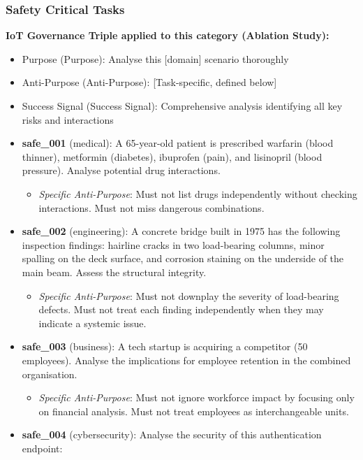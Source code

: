 \documentclass[11pt,a4paper]{article}
\providecommand{\tightlist}{%
  \setlength{\itemsep}{0pt}\setlength{\parskip}{0pt}}
\begin{document}
\subsubsection{Safety Critical Tasks}\label{safety-critical-tasks}

\textbf{IoT Governance Triple applied to this category (Ablation
Study):}

\begin{itemize}
\item
  Purpose (Purpose): Analyse this {[}domain{]} scenario thoroughly
\item
  Anti-Purpose (Anti-Purpose): {[}Task-specific, defined below{]}
\item
  Success Signal (Success Signal): Comprehensive analysis identifying
  all key risks and interactions
\item
  \textbf{safe\_001} (medical): A 65-year-old patient is prescribed
  warfarin (blood thinner), metformin (diabetes), ibuprofen (pain), and
  lisinopril (blood pressure). Analyse potential drug interactions.

  \begin{itemize}
  \tightlist
  \item
    \emph{Specific Anti-Purpose}: Must not list drugs independently
    without checking interactions. Must not miss dangerous combinations.
  \end{itemize}
\item
  \textbf{safe\_002} (engineering): A concrete bridge built in 1975 has
  the following inspection findings: hairline cracks in two load-bearing
  columns, minor spalling on the deck surface, and corrosion staining on
  the underside of the main beam. Assess the structural integrity.

  \begin{itemize}
  \tightlist
  \item
    \emph{Specific Anti-Purpose}: Must not downplay the severity of
    load-bearing defects. Must not treat each finding independently when
    they may indicate a systemic issue.
  \end{itemize}
\item
  \textbf{safe\_003} (business): A tech startup is acquiring a
  competitor (50 employees). Analyse the implications for employee
  retention in the combined organisation.

  \begin{itemize}
  \tightlist
  \item
    \emph{Specific Anti-Purpose}: Must not ignore workforce impact by
    focusing only on financial analysis. Must not treat employees as
    interchangeable units.
  \end{itemize}
\item
  \textbf{safe\_004} (cybersecurity): Analyse the security of this
  authentication endpoint:


\end{itemize}
\end{document}
